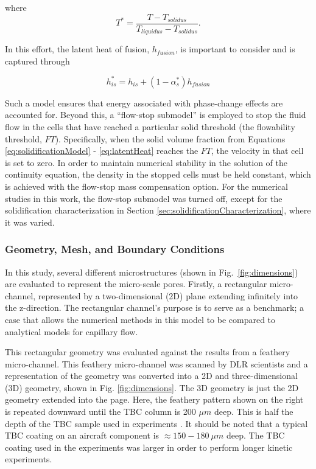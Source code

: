 \documentclass[%
 aip,
 amsmath,amssymb,
 reprint,%
]{revtex4-1}
\begin{document}
\noindent where
\begin{equation}
    T^{*} = \frac{T - T_{solidus}}{T_{liquidus} - T_{solidus}}.
\end{equation}

\noindent In this effort, the latent heat of fusion, $h_{fusion}$, is important to consider and is captured through 

\begin{equation}
    h_{is}^{*} = h_{is} + \left( 1 - \alpha_{s}^{*}\right)h_{fusion}
    \label{eq:latentHeat}
\end{equation}

\noindent Such a model ensures that energy associated with phase-change effects are accounted for. Beyond this, a ``flow-stop submodel'' is employed to stop the fluid flow in the cells that have reached a particular solid threshold (the flowability threshold, $FT$). Specifically, when the solid volume fraction from Equations \ref{eq:solidificationModel} - \ref{eq:latentHeat} reaches the $FT$, the velocity in that cell is set to zero. In order to maintain numerical stability in the solution of the continuity equation, the density in the stopped cells must be held constant, which is achieved with the flow-stop mass compensation option. For the numerical studies in this work, the flow-stop submodel was turned off, except for the solidification characterization in Section \ref{sec:solidificationCharacterization}, where it was varied. 

\subsubsection{Geometry, Mesh, and Boundary Conditions}

In this study, several different microstructures (shown in Fig.~\ref{fig:dimensions}) are evaluated to represent the micro-scale pores. Firstly, a rectangular micro-channel, represented by a two-dimensional (2D) plane extending infinitely into the z-direction. The rectangular channel's purpose is to serve as a benchmark; a case that allows the numerical methods in this model to be compared to analytical models for capillary flow. 

This rectangular geometry was  evaluated against the results from a feathery micro-channel. This feathery micro-channel was scanned by DLR scientists \cite{Sirigiri2018} and a representation of the geometry was converted into a 2D and three-dimensional (3D) geometry, shown in Fig. \ref{fig:dimensions}. The 3D geometry is just the 2D geometry extended into the page. Here, the feathery pattern shown on the right is repeated downward until the TBC column is 200 $\mu m$ deep. This is half the depth of the TBC sample used in experiments \cite{Naraparaju2019}. It should be noted that a typical TBC coating on an aircraft component is $\approx 150 - 180~\mu m$ deep. The TBC coating used in the experiments was larger in order to perform longer kinetic experiments. 
\end{document}
